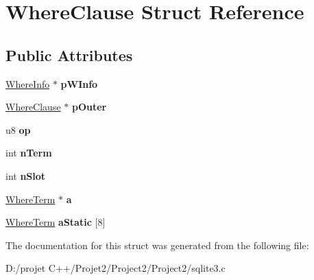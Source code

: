 \hypertarget{struct_where_clause}{}\section{Where\+Clause Struct Reference}
\label{struct_where_clause}
\subsection*{Public Attributes}
\begin{DoxyCompactItemize}
\item 
\mbox{\label{struct_where_clause_a40045b5806b481237c7fc4c0e21cd29b}} 
\mbox{\hyperlink{struct_where_info}{Where\+Info}} $\ast$ {\bfseries p\+W\+Info}
\item 
\mbox{\label{struct_where_clause_a6f72d61f416a323f39a8d3e2be62f607}} 
\mbox{\hyperlink{struct_where_clause}{Where\+Clause}} $\ast$ {\bfseries p\+Outer}
\item 
\mbox{\label{struct_where_clause_a7a56a5fe1ab6603e930f3b5372ff2f71}} 
u8 {\bfseries op}
\item 
\mbox{\label{struct_where_clause_ab84924c3c78af1ab387ab3919c5031c4}} 
int {\bfseries n\+Term}
\item 
\mbox{\label{struct_where_clause_ac92b93d65d4c3d9216707a049a4edb1c}} 
int {\bfseries n\+Slot}
\item 
\mbox{\label{struct_where_clause_a140d726a3e20ac7b6853d539c59add72}} 
\mbox{\hyperlink{struct_where_term}{Where\+Term}} $\ast$ {\bfseries a}
\item 
\mbox{\label{struct_where_clause_a4acb8640bc9f42752900de5735bcd8e0}} 
\mbox{\hyperlink{struct_where_term}{Where\+Term}} {\bfseries a\+Static} \mbox{[}8\mbox{]}
\end{DoxyCompactItemize}


The documentation for this struct was generated from the following file\+:\begin{DoxyCompactItemize}
\item 
D\+:/projet C++/\+Projet2/\+Project2/\+Project2/sqlite3.\+c\end{DoxyCompactItemize}
